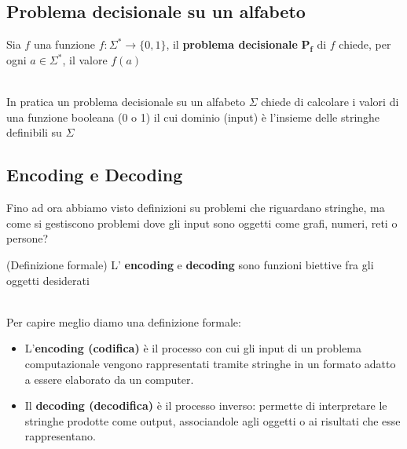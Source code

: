 \subsection{Problema decisionale su un alfabeto}
\colorbox{SALZO}{\parbox{\dimexpr\linewidth-2\fboxsep}{\begin{definition}
   Sia $f$ una funzione $f: \Sigma^* \to \{0,1\}$, il \textbf{problema decisionale} $\bm{P_f}$ di $f$ chiede, per ogni $a \in \Sigma^*$, il valore $f(a)$ 
\end{definition}}}\smallskip\\
In pratica un problema decisionale su un alfabeto $\Sigma$ chiede di calcolare i valori di una funzione booleana (0 o 1) il cui dominio (input) è l'insieme delle stringhe definibili
su $\Sigma$  



\subsection{Encoding e Decoding}
Fino ad ora abbiamo visto definizioni su problemi che riguardano stringhe, ma come si gestiscono problemi dove gli input sono oggetti come grafi, numeri, reti o persone?\smallskip\\
\colorbox{SALZO}{\parbox{\dimexpr\linewidth-2\fboxsep}{\begin{definition}
   (Definizione formale) L' \textbf{encoding } e \textbf{decoding} sono funzioni biettive fra gli oggetti desiderati
\end{definition}}}\smallskip\\
Per capire meglio diamo una definizione formale: 
\begin{itemize}
    \item L’\textbf{encoding (codifica)} è il processo con cui gli input di un problema computazionale vengono rappresentati tramite stringhe in un formato adatto a essere elaborato da un computer.
    \item Il \textbf{decoding (decodifica)} è il processo inverso: permette di interpretare le stringhe prodotte come output, associandole agli oggetti o ai risultati che esse rappresentano.
\end{itemize}




